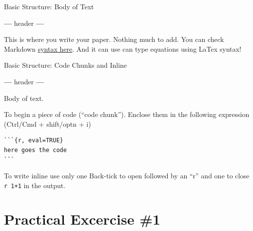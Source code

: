\documentclass[ignorenonframetext,]{beamer}
\newenvironment{Shaded}{\begin{snugshade}}{\end{snugshade}}
\newcommand{\NormalTok}[1]{#1}
\newcommand{\OperatorTok}[1]{\textcolor[rgb]{0.81,0.36,0.00}{\textbf{#1}}}
\begin{document}
\begin{frame}[fragile]{Basic Structure: Body of Text}
\protect\hypertarget{basic-structure-body-of-text}{}

\begin{Shaded}
\begin{Highlighting}[]
\OperatorTok{---}
\NormalTok{header}
\OperatorTok{---}
\end{Highlighting}
\end{Shaded}

This is where you write your paper. Nothing much to add. You can check
Markdown
\href{https://www.rstudio.com/wp-content/uploads/2015/02/rmarkdown-cheatsheet.pdf}{syntax
here}. And it can use can type equations using LaTex syntax!

\end{frame}

\begin{frame}[fragile]{Basic Structure: Code Chunks and Inline}
\protect\hypertarget{basic-structure-code-chunks-and-inline}{}

\begin{Shaded}
\begin{Highlighting}[]
\OperatorTok{---}
\NormalTok{header}
\OperatorTok{---}
\end{Highlighting}
\end{Shaded}

Body of text.

To begin a piece of code (``code chunk''). Enclose them in the following
expression (Ctrl/Cmd + shift/optn + i)

\begin{verbatim}
```{r, eval=TRUE}
here goes the code
```
\end{verbatim}

To write inline use only one Back-tick to open followed by an ``r'' and
one to close \texttt{\textasciigrave{}r\ 1+1\textasciigrave{}} in the
output.

\end{frame}

\hypertarget{practical-excercise-1}{%
\section{Practical Excercise \#1}\label{practical-excercise-1}}
\end{document}
